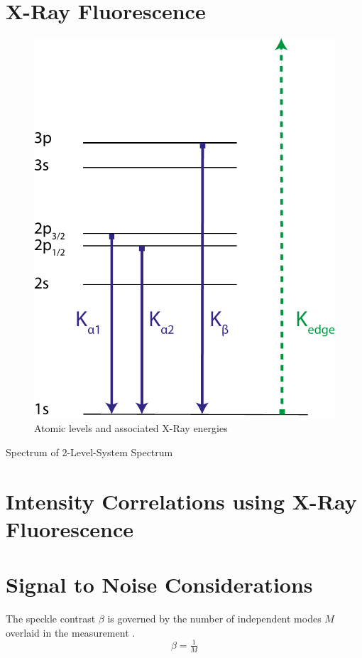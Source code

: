 \section{X-Ray Fluorescence}
 \begin{figure}
	\centering
	\includegraphics[width=0.4\linewidth]{images/levels.pdf}
	\caption[Atomic Levels]{Atomic levels and associated X-Ray energies}
	\label{fig:levels}
\end{figure}
Spectrum of 2-Level-System
Spectrum 

\section{Intensity Correlations using X-Ray Fluorescence}
\section{Signal to Noise Considerations}
The speckle contrast $\beta$ is governed by the number of independent modes $M$ overlaid in the measurement \cite{goodman2000}.
\begin{equation}
\beta =\tfrac{1}{M}
\end{equation}

